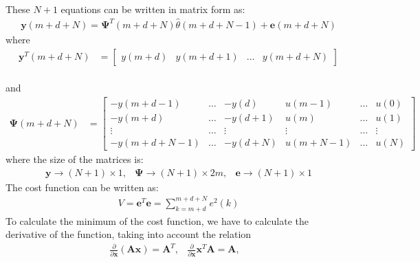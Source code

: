 \documentclass[12pt,a4paper,oneside]{book}
\begin{document}
\begin{onehalfspace}
These $N+1$ equations can be written in matrix form as:
\begin{equation}\label{eq:11}
	\begin{aligned}
		\boxed{\mathbf{y}(m+d+N) = 
		\mathbf{\Psi}^T(m+d+N)\hat{\theta}(m+d+N-1)+\mathbf{e}(m+d+N)}
	\end{aligned}
\end{equation} 
where 
\begin{equation*}\label{eq:12}
	\begin{aligned}
		\mathbf{y}^T(m+d+N) & = 
		\begin{bmatrix}
			y(m+d) & y(m+d+1) & \dots & y(m+d+N)
		\end{bmatrix}
	\end{aligned}
\end{equation*}\\
and
\begin{equation*}\label{eq:13}
	\begin{aligned}
		\mathbf{\Psi}(m+d+N) & = 
		\begin{bmatrix}
			-y(m+d-1) & \dots & -y(d) & u(m-1) & \dots & u(0) \\[6pt]
			-y(m+d) & \dots & -y(d+1) & u(m) & \dots & u(1) \\[6pt]
			\vdots & \dots & \vdots & \vdots & \dots & \vdots \\[6pt]
			-y(m+d+N-1) & \dots & -y(d+N) & u(m+N-1) & \dots & u(N) 
		\end{bmatrix}
	\end{aligned}
\end{equation*}
where the size of the matrices is:
\begin{equation*}
	\begin{matrix}
		\mathbf{y}\rightarrow (N+1) \times 1, & \mathbf{\Psi}\rightarrow (N+1) 
		\times 2m, & \mathbf{e}\rightarrow (N+1) \times 1
	\end{matrix}
\end{equation*}
The cost function can be written as:
\begin{equation}\label{eq:14}
	\begin{aligned}
		\boxed{V = \mathbf{e}^T\mathbf{e} = \sum_{k=m+d}^{m+d+N}e^2(k)}
	\end{aligned}
\end{equation} 
To calculate the minimum of the cost function, we have to calculate the 
derivative of the function, taking into account the relation $$\begin{matrix} 
\frac{\partial}{\partial\mathbf{x}}(\mathbf{Ax})=\mathbf{A}^T, & 
\frac{\partial}{\partial\mathbf{x}}\mathbf{x}^T\mathbf{A}=\mathbf{A}, & 

\end{matrix}$$
\end{onehalfspace}
\end{document}
